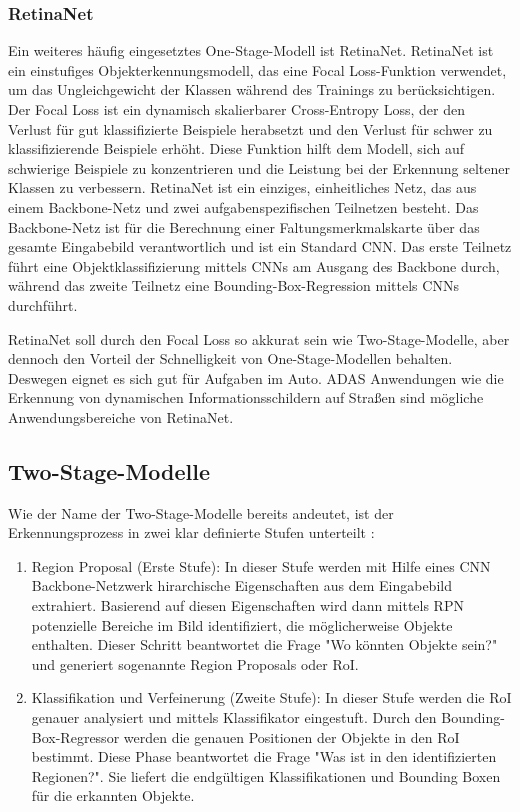 \subsubsection{RetinaNet}

Ein weiteres häufig eingesetztes One-Stage-Modell ist RetinaNet. RetinaNet ist ein einstufiges Objekterkennungsmodell, das eine Focal Loss-Funktion verwendet, um das Ungleichgewicht der Klassen während des Trainings zu berücksichtigen. Der Focal Loss ist ein dynamisch skalierbarer Cross-Entropy Loss, der den Verlust für gut klassifizierte Beispiele herabsetzt und den Verlust für schwer zu klassifizierende Beispiele erhöht. Diese Funktion hilft dem Modell, sich auf schwierige Beispiele zu konzentrieren und die Leistung bei der Erkennung seltener Klassen zu verbessern. RetinaNet ist ein einziges, einheitliches Netz, das aus einem Backbone-Netz und zwei aufgabenspezifischen Teilnetzen besteht. Das Backbone-Netz ist für die Berechnung einer Faltungsmerkmalskarte über das gesamte Eingabebild verantwortlich und ist ein Standard \ac{CNN}. Das erste Teilnetz führt eine Objektklassifizierung mittels \acp{CNN} am Ausgang des Backbone durch, während das zweite Teilnetz eine Bounding-Box-Regression mittels \acp{CNN} durchführt. \cite{RetinaNet} 

RetinaNet soll durch den Focal Loss so akkurat sein wie Two-Stage-Modelle, aber dennoch den Vorteil der Schnelligkeit von One-Stage-Modellen behalten. Deswegen eignet es sich gut für Aufgaben im Auto. \ac{ADAS} Anwendungen wie die Erkennung von dynamischen Informationsschildern auf Straßen sind mögliche Anwendungsbereiche von RetinaNet. \cite{DeLasHeras2021AdvancedDA}


\subsection{Two-Stage-Modelle}

Wie der Name der Two-Stage-Modelle bereits andeutet, ist der Erkennungsprozess in zwei klar definierte Stufen unterteilt \cite{FasterRCNN}:
\begin{enumerate}
    \item Region Proposal (Erste Stufe): In dieser Stufe werden mit Hilfe eines \ac{CNN} Backbone-Netzwerk hirarchische Eigenschaften aus dem Eingabebild extrahiert. Basierend auf diesen Eigenschaften wird dann mittels \ac{RPN} potenzielle Bereiche im Bild identifiziert, die möglicherweise Objekte enthalten. Dieser Schritt beantwortet die Frage "Wo könnten Objekte sein?" und generiert sogenannte Region Proposals oder \ac{RoI}.
    \item Klassifikation und Verfeinerung (Zweite Stufe): In dieser Stufe werden die \ac{RoI} genauer analysiert und mittels Klassifikator eingestuft. Durch den Bounding-Box-Regressor werden die genauen Positionen der Objekte in den \ac{RoI} bestimmt. Diese Phase beantwortet die Frage "Was ist in den identifizierten Regionen?". Sie liefert die endgültigen Klassifikationen und Bounding Boxen für die erkannten Objekte.
\end{enumerate}

